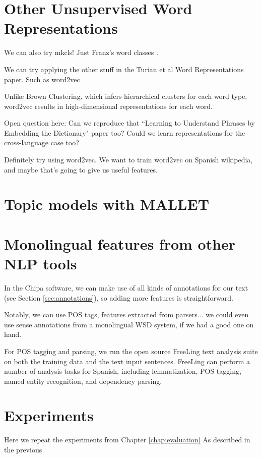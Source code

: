 \section{Other Unsupervised Word Representations}
We can also try mkcls! Just Franz's word classes \cite{och1999efficient}.


We can try applying the other stuff in the Turian et al Word Representations
paper. Such as word2vec \cite{mikolovword2vec}

Unlike Brown Clustering, which infers hierarchical clusters for each word type,
word2vec results in high-dimensional representations for each word.

Open question here:
Can we reproduce that ``Learning to Understand Phrases by Embedding the
Dictionary" paper too? Could we learn representations for the cross-language
case too?

Definitely try using word2vec. We want to train word2vec on Spanish wikipedia,
and maybe that's going to give us useful features.

\section{Topic models with MALLET}

\section{Monolingual features from other NLP tools}
In the Chipa software, we can make use of all kinds of annotations for our
text (see Section \ref{sec:annotations}), so adding more features is
straightforward.

Notably, we can use POS tags, features extracted from parsers... we could even
use sense annotations from a monolingual WSD system, if we had a good one on
hand.

For POS tagging and parsing, we run the open source FreeLing text analysis
suite \cite{padro12} on both the training data and the text input sentences.
FreeLing can perform a number of analysis tasks for Spanish, including
lemmatization, POS tagging, named entity recognition, and dependency parsing.

\section{Experiments}
Here we repeat the experiments from Chapter \ref{chap:evaluation}
As described in the previous
